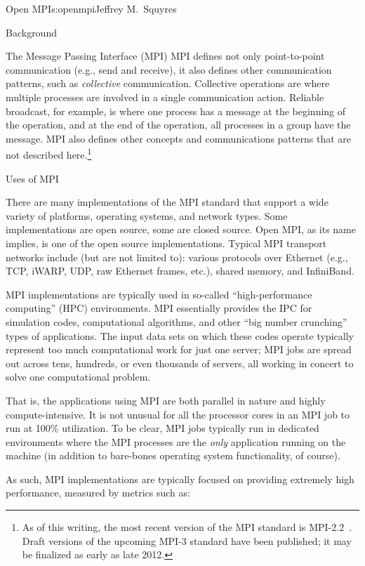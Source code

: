 \begin{aosachapter}{Open MPI}{s:openmpi}{Jeffrey M.\ Squyres}
\begin{aosasect1}{Background}
\begin{aosasect2}{The Message Passing Interface (MPI)}
MPI defines not only point-to-point communication (e.g., send and
receive), it also defines other communication patterns, such as
\emph{collective} communication.  Collective operations are where
multiple processes are involved in a single communication action.
Reliable broadcast, for example, is where one process has a message at
the beginning of the operation, and at the end of the operation, all
processes in a group have the message.
MPI also defines other concepts and communications patterns that are not
described here.\footnote{As of this writing, the most recent version
  of the MPI standard is MPI-2.2~\cite{bib:mpi-22}.  Draft versions of
  the upcoming MPI-3 standard have been published; it may be finalized
  as early as late 2012.}

\end{aosasect2}


\begin{aosasect2}{Uses of MPI}

There are many implementations of the MPI standard that support a
wide variety of platforms, operating systems, and network types.
Some implementations are open source, some are closed source.  
%
Open MPI, as its name implies, is one of the open source
implementations.
%
Typical MPI transport networks include (but are not limited to):
various protocols over Ethernet (e.g., TCP, iWARP, UDP, raw Ethernet
frames, etc.), shared memory, and InfiniBand.

MPI implementations are typically used in so-called ``high-performance
computing'' (HPC) environments.  MPI essentially provides the IPC for
simulation codes, computational algorithms, and other ``big number
crunching'' types of applications.  The input data sets on which these
codes operate typically represent too much computational work for just
one server; MPI jobs are spread out across tens, hundreds, or even
thousands of servers, all working in concert to solve one
computational problem.

That is, the applications using MPI are both parallel in nature and
highly compute-intensive.  It is not unusual for all the processor
cores in an MPI job to run at 100\% utilization.  To be clear, MPI
jobs typically run in dedicated environments where the MPI processes
are the \emph{only} application running on the machine (in addition to
bare-bones operating system functionality, of course).

As such, MPI implementations are typically focused on providing
extremely high performance, measured by metrics such as:


\end{aosasect2}
\end{aosasect1}
\end{aosachapter}
